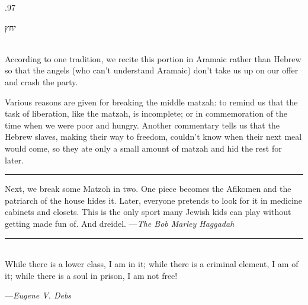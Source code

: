\documentclass[letter,11pt,openany]{memoir}
\newcommand{\HgSource}[1]{\hfill{\small---\itshape{#1}}}
\newcommand{\hchapter}[1]{ 
\begin{hebrew}
	\begin{Spacing}
		{.97} 
		\newpage \strut
		
		\vspace{.15em}
		\begin{flushleft}
			\noindent\Huge #1 
		\end{flushleft}
		
		\vspace{1em} 
	\end{Spacing}
\end{hebrew}

}
\newcommand{\HgFill}{
\vfill \hrule 
\vfill}
\newenvironment{HgEnglish}{\strut\\
\noindent}{\vspace{1em}}
\begin{document}
\hchapter{יחץ}
\begin{HgEnglish}
	According to one tradition, we recite this portion in Aramaic rather than Hebrew so that the angels (who can't understand Aramaic) don't take us up on our offer and crash the party.
	
	Various reasons are given for breaking the middle matzah: to remind us that the task of liberation, like the matzah, is incomplete; or in commemoration of the time when we were poor and hungry. Another commentary tells us that the Hebrew slaves, making their way to freedom, couldn't know when their next meal would come, so they ate only a small amount of matzah and hid the rest for later. 
\end{HgEnglish}

\HgFill

%
\noindent Next, we break some Matzoh in two. One piece becomes the Afikomen and the patriarch of the house hides it. Later, everyone pretends to look for it in medicine cabinets and closets. This is the only sport many Jewish kids can play without getting made fun of. And dreidel. \HgSource{The Bob Marley Haggadah}

\HgFill
\begin{HgEnglish}
	While there is a lower class, I am in it; while there is a criminal element, I am of it; while there is a soul in prison, I am not free!
	
	\HgSource{Eugene V. Debs} 
\end{HgEnglish}
\end{document}
